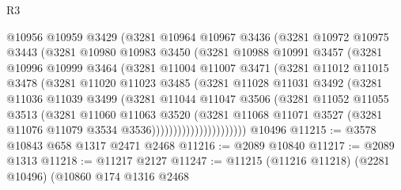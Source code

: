 \begin{lexlean}{R3}
\begin{coremodule}
                  @10956
                  @10959
                  @3429
                  (@3281
                    @10964
                    @10967
                    @3436
                    (@3281
                      @10972
                      @10975
                      @3443
                      (@3281
                        @10980
                        @10983
                        @3450
                        (@3281
                          @10988
                          @10991
                          @3457
                          (@3281
                            @10996
                            @10999
                            @3464
                            (@3281
                              @11004
                              @11007
                              @3471
                              (@3281
                                @11012
                                @11015
                                @3478
                                (@3281
                                  @11020
                                  @11023
                                  @3485
                                  (@3281
                                    @11028
                                    @11031
                                    @3492
                                    (@3281
                                      @11036
                                      @11039
                                      @3499
                                      (@3281
                                        @11044
                                        @11047
                                        @3506
                                        (@3281
                                          @11052
                                          @11055
                                          @3513
                                          (@3281
                                            @11060
                                            @11063
                                            @3520
                                            (@3281
                                              @11068
                                              @11071
                                              @3527
                                              (@3281 @11076 @11079 @3534 @3536))))))))))))))))))))))
    @10496
@11215 := @3578 @10843 @658 @1317 @2471 @2468
@11216 := @2089 @10840
@11217 := @2089 @1313
@11218 := @11217 @2127
@11247 := @11215
    (@11216 @11218)
    (@2281 @10496)
    (@10860
      @174
      @1316
      @2468

\end{coremodule}
\end{lexlean}
